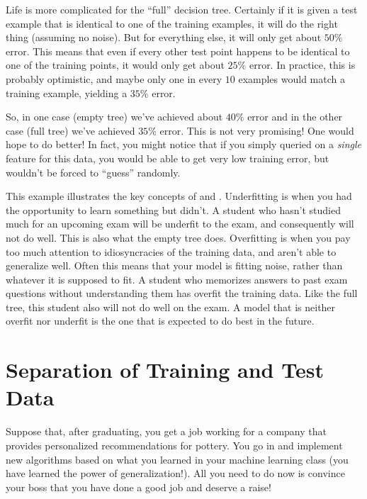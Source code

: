 Life is more complicated for the ``full'' decision tree.  Certainly if
it is given a test example that is identical to one of the training
examples, it will do the right thing (assuming no noise).  But for
everything else, it will only get about $50\%$ error.  This means that
even if every other test point happens to be identical to one of the
training points, it would only get about $25\%$ error.  In practice,
this is probably optimistic, and maybe only one in every $10$ examples
would match a training example, yielding a $35\%$ error.


So, in one case (empty tree) we've achieved about $40\%$ error and in
the other case (full tree) we've achieved $35\%$ error.  This is not
very promising!  One would hope to do better!  In fact, you might
notice that if you simply queried on a \emph{single} feature for this
data, you would be able to get very low training error, but wouldn't
be forced to ``guess'' randomly.


This example illustrates the key concepts of 
and .  Underfitting is when you had the
opportunity to learn something but didn't.  A student who hasn't
studied much for an upcoming exam will be underfit to the exam, and
consequently will not do well.  This is also what the empty tree
does.  Overfitting is when you pay too much attention to
idiosyncracies of the training data, and aren't able to generalize
well.  Often this means that your model is fitting noise, rather than
whatever it is supposed to fit.  A student who memorizes answers to
past exam questions without understanding them has overfit the
training data.  Like the full tree, this student also will not do well
on the exam.  A model that is neither overfit nor underfit is the one
that is expected to do best in the future.

\section{Separation of Training and Test Data}

Suppose that, after graduating, you get a job working for a company
that provides personalized recommendations for pottery.  You go in and
implement new algorithms based on what you learned in your machine
learning class (you have learned the power of generalization!).  All
you need to do now is convince your boss that you have done a good job
and deserve a raise!

